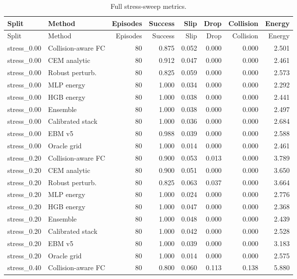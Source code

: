 {\scriptsize
\setlength{\tabcolsep}{2.5pt}
\begin{longtable}{llrrrrrr}
\caption{Full stress-sweep metrics.}\label{tab:full-stress}\\
\toprule
Split & Method & Episodes & Success & Slip & Drop & Collision & Energy \\
\midrule
\endfirsthead
\toprule
Split & Method & Episodes & Success & Slip & Drop & Collision & Energy \\
\midrule
\endhead
stress\_0.00 & Collision-aware FC & 80 & 0.875 & 0.052 & 0.000 & 0.000 & 2.501 \\
stress\_0.00 & CEM analytic & 80 & 0.912 & 0.047 & 0.000 & 0.000 & 2.461 \\
stress\_0.00 & Robust perturb. & 80 & 0.825 & 0.059 & 0.000 & 0.000 & 2.573 \\
stress\_0.00 & MLP energy & 80 & 1.000 & 0.034 & 0.000 & 0.000 & 2.292 \\
stress\_0.00 & HGB energy & 80 & 1.000 & 0.038 & 0.000 & 0.000 & 2.441 \\
stress\_0.00 & Ensemble & 80 & 1.000 & 0.038 & 0.000 & 0.000 & 2.497 \\
stress\_0.00 & Calibrated stack & 80 & 1.000 & 0.036 & 0.000 & 0.000 & 2.684 \\
stress\_0.00 & EBM v5 & 80 & 0.988 & 0.039 & 0.000 & 0.000 & 2.588 \\
stress\_0.00 & Oracle grid & 80 & 1.000 & 0.014 & 0.000 & 0.000 & 2.461 \\
stress\_0.20 & Collision-aware FC & 80 & 0.900 & 0.053 & 0.013 & 0.000 & 3.789 \\
stress\_0.20 & CEM analytic & 80 & 0.900 & 0.051 & 0.000 & 0.000 & 3.650 \\
stress\_0.20 & Robust perturb. & 80 & 0.825 & 0.063 & 0.037 & 0.000 & 3.664 \\
stress\_0.20 & MLP energy & 80 & 1.000 & 0.024 & 0.000 & 0.000 & 2.776 \\
stress\_0.20 & HGB energy & 80 & 1.000 & 0.047 & 0.000 & 0.000 & 2.368 \\
stress\_0.20 & Ensemble & 80 & 1.000 & 0.048 & 0.000 & 0.000 & 2.439 \\
stress\_0.20 & Calibrated stack & 80 & 1.000 & 0.042 & 0.000 & 0.000 & 2.528 \\
stress\_0.20 & EBM v5 & 80 & 1.000 & 0.039 & 0.000 & 0.000 & 3.183 \\
stress\_0.20 & Oracle grid & 80 & 1.000 & 0.014 & 0.000 & 0.000 & 2.575 \\
stress\_0.40 & Collision-aware FC & 80 & 0.800 & 0.060 & 0.113 & 0.138 & 5.880 \\

\end{longtable}}
